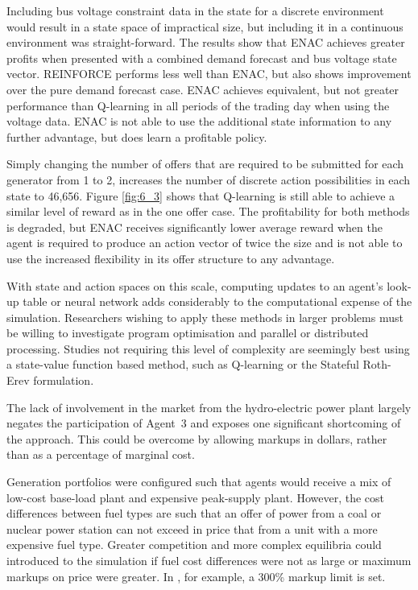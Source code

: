 Including bus voltage constraint data in the state for a discrete environment
would result in a state space of impractical size, but including it in a
continuous environment was straight-forward.  The results show that ENAC
achieves greater profits when presented with a combined demand forecast and bus
voltage state vector.  REINFORCE performs less well than ENAC, but also shows
improvement over the pure demand forecast case.  ENAC achieves equivalent, but
not greater performance than Q-learning in all periods of the trading day when
using the voltage data.  ENAC is not able to use the additional state
information to any further advantage, but does learn a profitable policy.

Simply changing the number of offers that are required to be submitted for each
generator from 1 to 2, increases the number of discrete action possibilities in
each state to 46,656.  Figure \ref{fig:6_3} shows that Q-learning is still able
to achieve a similar level of reward as in the one offer case.  The
profitability for both methods is degraded, but ENAC receives significantly
lower average reward when the agent is required to produce an action
vector of twice the size and is not able to use the increased flexibility in
its offer structure to any advantage.

With state and action spaces on this scale, computing updates to an agent's
look-up table or neural network adds considerably to the computational expense
of the simulation.  Researchers wishing to apply these methods in larger
problems must be willing to investigate program optimisation and parallel or
distributed processing.  Studies not requiring this level of complexity are
seemingly best using a state-value function based method, such as Q-learning or
the Stateful Roth-Erev formulation.

The lack of involvement in the market from the hydro-electric power plant
largely negates the participation of Agent~3 and exposes one significant
shortcoming of the approach. This could be overcome by allowing markups
in dollars, rather than as a percentage of marginal cost.

Generation portfolios were configured such that agents would receive a mix of
low-cost base-load plant and expensive peak-supply plant.  However, the cost
differences between fuel types are such that an offer of power from a coal or
nuclear power station can not exceed in price that from a unit with a more
expensive fuel type.  Greater competition and more complex equilibria could
introduced to the simulation if fuel cost differences were not as large or
maximum markups on price were greater.  In , for example, a
300\% markup limit is set.

